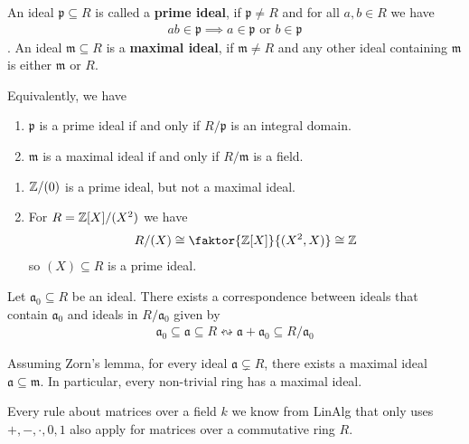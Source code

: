 \begin{dfn}[]
An ideal $\mathfrak{p} \subseteq R$ is called a \textbf{prime ideal}, if $\mathfrak{p} \neq R$ and for all $a,b \in R$ we have
\begin{align*}
  ab \in \mathfrak{p} \implies a \in \mathfrak{p} \text{ or } b \in \mathfrak{p}
\end{align*}.
An ideal $\mathfrak{m} \subseteq R$ is a \textbf{maximal ideal}, if $\mathfrak{m} \neq R$ and any other ideal containing $\mathfrak{m}$ is either $\mathfrak{m}$ or $R$.

Equivalently, we have
\begin{enumerate}
  \item $\mathfrak{p}$ is a prime ideal if and only if $R/\mathfrak{p}$ is an integral domain.
  \item $\mathfrak{m}$ is a maximal ideal if and only if $R/\mathfrak{m}$ is a field.
\end{enumerate}
\end{dfn}

\begin{enumerate}
  \item $\mathbb{Z}/(0)$ is a prime ideal, but not a maximal ideal.
  \item For $R = \mathbb{Z}[X]/(X^{2})$ we have
    \begin{align*}
      R/(X) \iso \faktor{\Z[X]}{(X^{2},X)} \iso \Z
    \end{align*}
    so $(X) \subseteq R$ is a prime ideal.
\end{enumerate}


\begin{prop}[]
  Let $\mathfrak{a}_0 \subseteq R$ be an ideal.
  There exists a correspondence between ideals that contain $\mathfrak{a}_0$ and ideals in $R/\mathfrak{a}_0$ given by
  \begin{align*}
    \mathfrak{a}_0 \subseteq \mathfrak{a} \subseteq R \leftrightsquigarrow \mathfrak{a} + \mathfrak{a}_0 \subseteq R/\mathfrak{a}_0
  \end{align*}
\end{prop}

\begin{thm}
  Assuming Zorn's lemma, for every ideal $\mathfrak{a} \subsetneq R$, there exists a maximal ideal $\mathfrak{a} \subseteq \mathfrak{m}$.
  In particular, every non-trivial ring has a maximal ideal.
\end{thm}


\begin{prop}
  Every rule about matrices over a field $k$ we know from LinAlg that only uses $+,-,\cdot,0,1$ also apply for matrices over a commutative ring $R$.
\end{prop}

